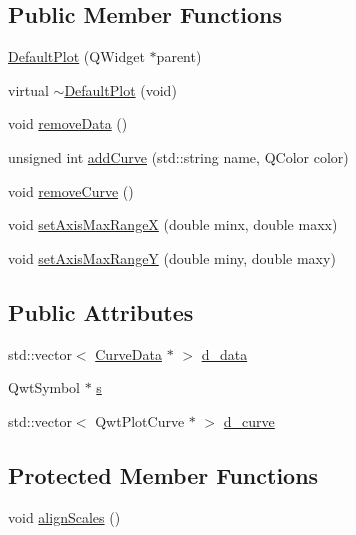 \subsection*{Public Member Functions}
\begin{DoxyCompactItemize}
\item 
\hyperlink{class_default_plot_a121e294348cf317ccb4eaa8725aa2a6f}{Default\+Plot} (Q\+Widget $\ast$parent)
\item 
virtual \hyperlink{class_default_plot_a102c42148b1e4c49dd77d0e4cf8cb05a}{$\sim$\+Default\+Plot} (void)
\item 
void \hyperlink{class_default_plot_ac66f2cf5b8bf20358add7261df109c9b}{remove\+Data} ()
\item 
unsigned int \hyperlink{class_default_plot_a5c9b858cc4b0b916a2f38e19cb4387c0}{add\+Curve} (std\+::string name, Q\+Color color)
\item 
void \hyperlink{class_default_plot_a572dcb659361187315a0beac070ab7f0}{remove\+Curve} ()
\item 
void \hyperlink{class_default_plot_a4d68b948dd93d81b37e3c1c39a5f29ce}{set\+Axis\+Max\+Range\+X} (double minx, double maxx)
\item 
void \hyperlink{class_default_plot_a98b4626122852228be88a4adf7b78929}{set\+Axis\+Max\+Range\+Y} (double miny, double maxy)
\end{DoxyCompactItemize}
\subsection*{Public Attributes}
\begin{DoxyCompactItemize}
\item 
std\+::vector$<$ \hyperlink{class_curve_data}{Curve\+Data} $\ast$ $>$ \hyperlink{class_default_plot_aa78c1b3ad9d6328731ecae5a27b9d0b1}{d\+\_\+data}
\item 
Qwt\+Symbol $\ast$ \hyperlink{class_default_plot_a30118ba9670ca7bf1c852e98bf76771a}{s}
\item 
std\+::vector$<$ Qwt\+Plot\+Curve $\ast$ $>$ \hyperlink{class_default_plot_a154b2bb7e4528185f88ff204da70e4de}{d\+\_\+curve}
\end{DoxyCompactItemize}
\subsection*{Protected Member Functions}
\begin{DoxyCompactItemize}
\item 
void \hyperlink{class_default_plot_ab58ec19e4da4991a5ef9e04f3cc1f24e}{align\+Scales} ()
\end{DoxyCompactItemize}
